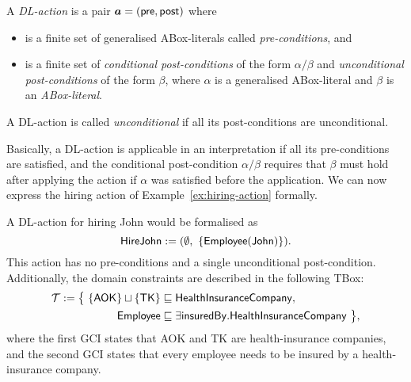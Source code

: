 \begin{definition}\label{def:action-syntax}
    A \emph{DL-action} is a pair $\boldsymbol a=(\mathsf{pre},\mathsf{post})$ where
    \begin{itemize}
        \item \pre is a finite set of generalised ABox-literals called
            \emph{pre-conditions}, and
        \item \post is a finite set of \emph{conditional post-conditions} of the
            form $\alpha/\beta$ and \emph{unconditional post-conditions} of the
            form $\beta$, where $\alpha$ is a generalised ABox-literal and
            $\beta$ is an \emph{ABox-literal}.
    \end{itemize}
    A DL-action is called \emph{unconditional} if all its post-conditions are
    unconditional.
\end{definition}

\noindent
Basically, a DL-action is applicable in an interpretation if all its
pre-conditions are satisfied, and the conditional post-condition $\alpha/\beta$
requires that $\beta$ must hold after applying the action if $\alpha$ was
satisfied before the application.
%
We can now express the hiring action of Example~\ref{ex:hiring-action} formally.

\begin{example}\label{ex:hiring-action-formally}
    A DL-action for hiring John would be formalised as
    \[\HireJohn:=(\emptyset,\ \{\Employee(\John)\}).\]
    This action has no pre-conditions and a single unconditional post-condition.
    Additionally, the domain constraints are described in the following TBox:
    \begin{align*}
        \mathcal{T}:=\bigl\{\ \{\mathsf{AOK}\}\sqcup\{\mathsf{TK}\}
        &\sqsubseteq\mathsf{HealthInsuranceCompany},\\
        \mathsf{Employee}
        &\sqsubseteq\exists\mathsf{insuredBy}.\mathsf{HealthInsuranceCompany}\ \bigr\},
    \end{align*}
    where the first GCI states that AOK and TK are health-insurance companies,
    and the second GCI states that every employee needs to be insured by a
    health-insurance company.
\end{example}

